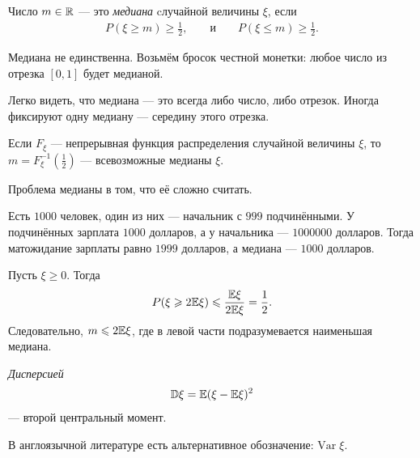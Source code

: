 \documentclass[../main.tex]{subfiles}
\begin{document}
\begin{df}
 Число $ m \in\mathbb{R}$ --- это \textit{медиана} cлучайной величины $ \xi $, если
 \begin{align*}
  P(\xi \geqslant m) \geqslant \frac{1}{2}, & &\text{ и } & &P(\xi \leqslant m) \geqslant \frac{1}{2}.
 \end{align*} 
\end{df}
\begin{remrk*}
 Медиана не единственна. Возьмём бросок честной монетки: любое число из отрезка $ [0,1] $ будет медианой.
\end{remrk*}
\begin{remrk*}
 Легко видеть, что медиана --- это всегда либо число, либо отрезок. Иногда фиксируют одну медиану --- середину этого отрезка.
\end{remrk*}

\begin{remrk*}
 Если $ F_\xi $ --- непрерывная функция распределения случайной величины $ \xi $, то $ m = F_\xi^{-1}(\frac{1}{2}) $ --- всевозможные медианы $ \xi $.
\end{remrk*}

Проблема медианы в том, что её сложно считать.

\begin{exmpl*}
 Есть $ 1000 $ человек, один из них --- начальник с $ 999 $ подчинёнными. У подчинённых зарплата $ 1000 $ долларов, а у начальника --- $ 1000000 $ долларов. Тогда матожидание зарплаты равно $ 1999 $ долларов, а медиана --- $ 1000 $ долларов.
\end{exmpl*}

\begin{remrk}
 Пусть $ \xi \geqslant 0 $. Тогда
 \begin{align*}
  P(\xi \geqslant 2\mathbb E\xi) \leqslant \frac{\mathbb E\xi}{2\mathbb E\xi} = \frac{1}{2}.
 \end{align*} Следовательно, $ m \leqslant 2\mathbb E\xi $, где в левой части подразумевается наименьшая медиана.
\end{remrk}

\begin{df}[дисперсия]
 \textit{Дисперсией}
 \begin{align*}
  \mathbb D \xi = \mathbb E (\xi - \mathbb E\xi)^{2}
 \end{align*} --- второй центральный момент.

\end{df}

В англоязычной литературе есть альтернативное обозначение: $ \mathrm{Var} \;\xi $.
\end{document}
